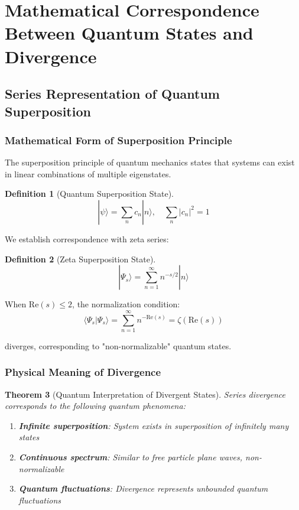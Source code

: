 \documentclass[11pt]{article}
\theoremstyle{plain}
\newtheorem{theorem}{Theorem}[section]
\theoremstyle{definition}
\newtheorem{definition}[theorem]{Definition}
\theoremstyle{remark}
\begin{document}
\section{Mathematical Correspondence Between Quantum States and Divergence}

\subsection{Series Representation of Quantum Superposition}

\subsubsection{Mathematical Form of Superposition Principle}

The superposition principle of quantum mechanics states that systems can exist in linear combinations of multiple eigenstates.

\begin{definition}[Quantum Superposition State]
$$|\psi\rangle = \sum_{n} c_n |n\rangle, \quad \sum_{n} |c_n|^2 = 1$$
\end{definition}

We establish correspondence with zeta series:

\begin{definition}[Zeta Superposition State]
$$|\Psi_s\rangle = \sum_{n=1}^{\infty} n^{-s/2} |n\rangle$$
\end{definition}

When $\text{Re}(s) \leq 2$, the normalization condition:
$$\langle \Psi_s | \Psi_s \rangle = \sum_{n=1}^{\infty} n^{-\text{Re}(s)} = \zeta(\text{Re}(s))$$

diverges, corresponding to "non-normalizable" quantum states.

\subsubsection{Physical Meaning of Divergence}

\begin{theorem}[Quantum Interpretation of Divergent States]
Series divergence corresponds to the following quantum phenomena:

\begin{enumerate}
\item \textbf{Infinite superposition}: System exists in superposition of infinitely many states
\item \textbf{Continuous spectrum}: Similar to free particle plane waves, non-normalizable
\item \textbf{Quantum fluctuations}: Divergence represents unbounded quantum fluctuations
\end{enumerate}
\end{theorem}
\end{document}
